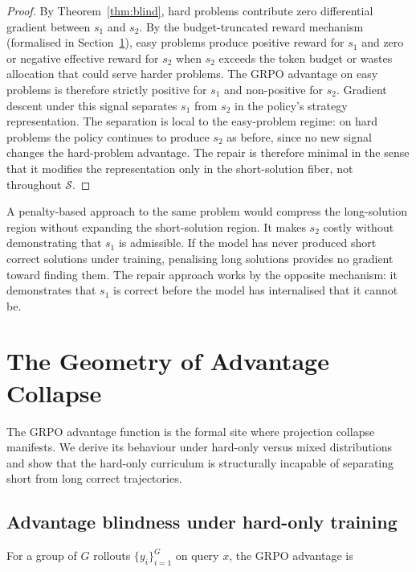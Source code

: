 \documentclass[11pt]{article}
\theoremstyle{rthm}
\theoremstyle{rdef}
\theoremstyle{remark}
\begin{document}
\begin{proof}
By Theorem~\ref{thm:blind}, hard problems contribute zero differential
gradient between $s_1$ and $s_2$. By the budget-truncated reward
mechanism (formalised in Section~\ref{sec:advantage}), easy problems
produce positive reward for $s_1$ and zero or negative effective reward
for $s_2$ when $s_2$ exceeds the token budget or wastes allocation that
could serve harder problems. The GRPO advantage on easy problems is
therefore strictly positive for $s_1$ and non-positive for $s_2$.
Gradient descent under this signal separates $s_1$ from $s_2$ in the
policy's strategy representation. The separation is local to the
easy-problem regime: on hard problems the policy continues to produce
$s_2$ as before, since no new signal changes the hard-problem advantage.
The repair is therefore minimal in the sense that it modifies the
representation only in the short-solution fiber, not throughout
$\mathcal{S}$.
\end{proof}

A penalty-based approach to the same problem would compress the
long-solution region without expanding the short-solution region.
It makes $s_2$ costly without demonstrating that $s_1$ is admissible.
If the model has never produced short correct solutions under training,
penalising long solutions provides no gradient toward finding them.
The repair approach works by the opposite mechanism: it demonstrates
that $s_1$ is correct before the model has internalised that it cannot
be.

\section{The Geometry of Advantage Collapse}
\label{sec:advantage}

The GRPO advantage function is the formal site where projection
collapse manifests. We derive its behaviour under hard-only versus
mixed distributions and show that the hard-only curriculum is
structurally incapable of separating short from long correct
trajectories.

\subsection{Advantage blindness under hard-only training}

For a group of $G$ rollouts $\{y_i\}_{i=1}^G$ on query $x$, the
GRPO advantage is
\end{document}
